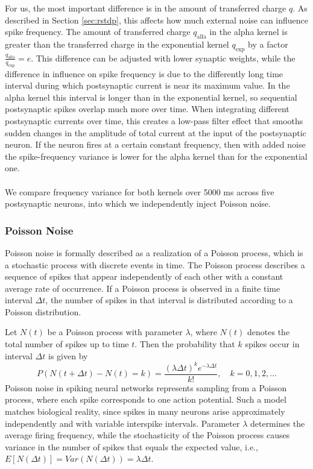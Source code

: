\documentclass[a4paper,12pt,openright]{book}
\begin{document}
For us, the most important difference is in the amount of transferred charge $q$. As described in Section \ref{sec:rstdp}, this affects how much external noise can influence spike frequency. The amount of transferred charge $q_{\text{alfa}}$ in the alpha kernel is greater than the transferred charge in the exponential kernel $q_{\text{exp}}$ by a factor $\frac{q_{\text{alfa}}}{q_{\text{exp}}} = e$. This difference can be adjusted with lower synaptic weights, while the difference in influence on spike frequency is due to the differently long time interval during which postsynaptic current is near its maximum value. In the alpha kernel this interval is longer than in the exponential kernel, so sequential postsynaptic spikes overlap much more over time. When integrating different postsynaptic currents over time, this creates a low-pass filter effect that smooths sudden changes in the amplitude of total current at the input of the postsynaptic neuron. If the neuron fires at a certain constant frequency, then with added noise the spike-frequency variance is lower for the alpha kernel than for the exponential one.
\\
\\
We compare frequency variance for both kernels over 5000 ms across five postsynaptic neurons, into which we independently inject Poisson noise. 

\subsubsection{Poisson Noise}
Poisson noise is formally described as a realization of a Poisson process, which is a stochastic process with discrete events in time. The Poisson process describes a sequence of spikes that appear independently of each other with a constant average rate of occurrence. If a Poisson process is observed in a finite time interval $\Delta t$, the number of spikes in that interval is distributed according to a Poisson distribution.

Let $N(t)$ be a Poisson process with parameter $\lambda$, where $N(t)$ denotes the total number of spikes up to time $t$. Then the probability that $k$ spikes occur in interval $\Delta t$ is given by
\begin{equation*}
    P(N(t + \Delta t) - N(t) = k) = \frac{(\lambda \Delta t)^k e^{-\lambda \Delta t}}{k!}, \quad k = 0, 1, 2, \ldots
\end{equation*}
Poisson noise in spiking neural networks represents sampling from a Poisson process, where each spike corresponds to one action potential. Such a model matches biological reality, since spikes in many neurons arise approximately independently and with variable interspike intervals. Parameter $\lambda$ determines the average firing frequency, while the stochasticity of the Poisson process causes variance in the number of spikes that equals the expected value, i.e., $E[N(\Delta t)] = Var(N(\Delta t)) = \lambda \Delta t$.
\end{document}
